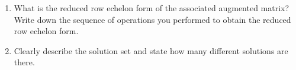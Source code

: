 \documentclass[11pt,table]{article}
\newcommand{\<}			{\langle}
\renewcommand{\>}      		{\rangle}
\begin{document}
\begin{enumerate}
\begin{enumerate}
	\item  What is the reduced row echelon form of the associated augmented matrix? Write down the sequence of operations you performed to obtain the reduced row echelon form. 
	
	\item Clearly describe the solution set and state how many different solutions are there. 
\end{enumerate}

\end{enumerate}
\end{document}
